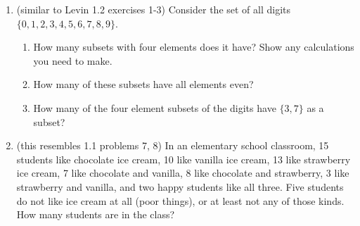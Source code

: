 \documentclass[12pt]{article}
\begin{document}
\begin{enumerate}
\item  (similar to Levin 1.2 exercises 1-3) Consider the set of all digits $\{0,1,2,3,4,5,6,7,8,9\}$.

\begin{enumerate}

\item  How many subsets with four elements does it have?  Show any calculations you need to make.

\item  How many of these subsets have all elements even?

\item  How many of the four element subsets of the digits have $\{3,7\}$ as a subset?

\end{enumerate}

\item (this resembles 1.1 problems  7, 8) In an elementary school classroom, 15 students like chocolate ice cream, 10 like vanilla ice cream, 13 like strawberry ice cream, 7 like chocolate and vanilla, 8 like chocolate and strawberry, 3 like strawberry and vanilla, and two happy students like all three.  Five students do not like ice cream at all (poor things), or at least not any of those kinds.  How many students are in the class?

\end{enumerate}
\end{document}
